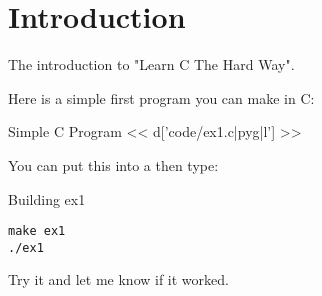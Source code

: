 \chapter{Introduction}

The introduction to "Learn C The Hard Way".

Here is a simple first program you can make in C:

\begin{code}{Simple C Program}
<< d['code/ex1.c|pyg|l'] >>
\end{code}

You can put this into a  then type:

\begin{code}{Building ex1}
\begin{Verbatim}
make ex1
./ex1
\end{Verbatim}
\end{code}

Try it and let me know if it worked.


